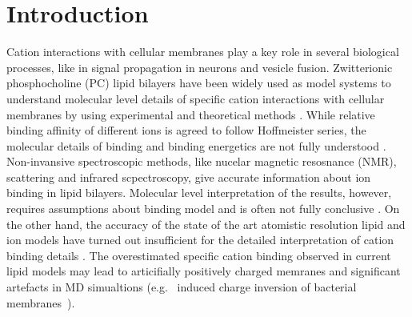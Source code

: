 \documentclass[aip,jcp,twocolumn]{revtex4}
\begin{document}
\section{Introduction}
Cation interactions with cellular membranes play a key role in several biological processes,
like in signal propagation in neurons and vesicle fusion.
Zwitterionic phosphocholine (PC) lipid bilayers have been widely used as model systems
to understand molecular level details of specific cation interactions with
cellular membranes by using experimental \cite{cevc90,tocanne90,binder02,pabst07,uhrikova08}
and theoretical methods \cite{bockmann03,bockmann04,Berkowitz12,??} .
While relative binding affinity of different ions is agreed to follow Hoffmeister
series, the molecular details of binding and binding energetics are
not fully understood \cite{cevc90,tocanne90,seelig90,binder02,catte16,??}.
Non-invansive spectroscopic methods, like nucelar magnetic resosnance (NMR), scattering
and infrared scpectroscopy, give accurate information about ion binding
in lipid bilayers\cite{hauser76,hauser78,herbette84,akutsu81,altenbach84,binder02}. 
Molecular level interpretation of the results, however, requires assumptions
about binding model and is often not fully conclusive \cite{??}.
On the other hand, the accuracy of the state of the art atomistic resolution lipid and ion models
have turned out insufficient for the detailed interpretation of cation binding details \cite{catte16}.
The overestimated specific cation binding observed in current lipid models \cite{catte16}
may lead to articifially positively charged memranes and significant artefacts in
MD simualtions (e.g.~ induced charge inversion of bacterial membranes~\cite{Luan2016}). 

\end{document}
